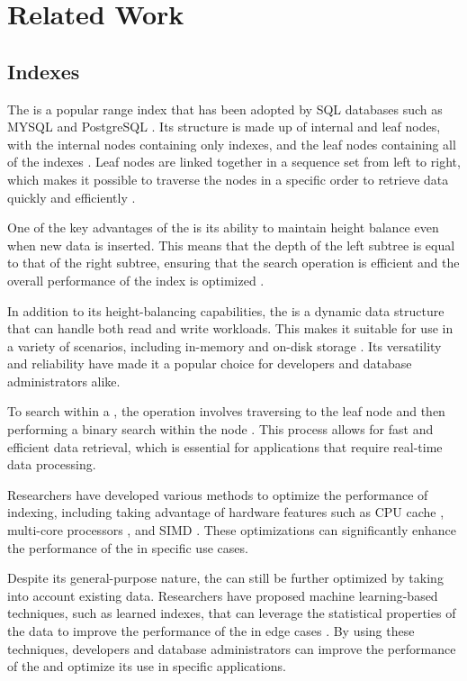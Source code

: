\chapter{Related Work}

\section{\btree Indexes}

The \btree is a popular range index that has been adopted by SQL databases such as MYSQL and PostgreSQL \cite{kieseberg2019analysis}. Its structure is made up of internal and leaf nodes, with the internal nodes containing only indexes, and the leaf nodes containing all of the indexes \cite{comer1979ubiquitous}. Leaf nodes are linked together in a sequence set from left to right, which makes it possible to traverse the nodes in a specific order to retrieve data quickly and efficiently \cite{comer1979ubiquitous}.

One of the key advantages of the \btree is its ability to maintain height balance even when new data is inserted. This means that the depth of the left subtree is equal to that of the right subtree, ensuring that the search operation is efficient and the overall performance of the index is optimized \cite{comer1979ubiquitous}.

In addition to its height-balancing capabilities, the \btree is a dynamic data structure that can handle both read and write workloads. This makes it suitable for use in a variety of scenarios, including in-memory and on-disk storage \cite{comer1979ubiquitous}. Its versatility and reliability have made it a popular choice for developers and database administrators alike.

To search within a \btree, the operation involves traversing to the leaf node and then performing a binary search within the node \cite{comer1979ubiquitous}. This process allows for fast and efficient data retrieval, which is essential for applications that require real-time data processing.

Researchers have developed various methods to optimize the performance of \btree indexing, including taking advantage of hardware features such as CPU cache \cite{CSSCSBTree}, multi-core processors \cite{srinivasan1991performance}, and SIMD \cite{FAST}. These optimizations can significantly enhance the performance of the \btree in specific use cases.

Despite its general-purpose nature, the \btree can still be further optimized by taking into account existing data. Researchers have proposed machine learning-based techniques, such as learned indexes, that can leverage the statistical properties of the data to improve the performance of the \btree in edge cases \cite{CasedLearnedIndex}. By using these techniques, developers and database administrators can improve the performance of the \btree and optimize its use in specific applications.

